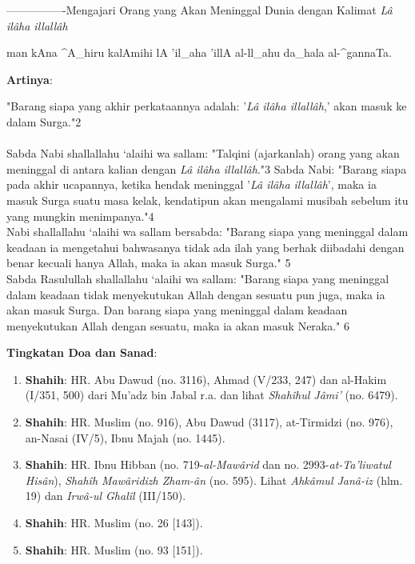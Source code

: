 \documentclass[a4paper,12pt]{article}
\begin{document}
\par
{}----------------Mengajari Orang yang Akan Meninggal Dunia dengan Kalimat 
\textit{L\^{a} il\^{a}ha illall\^{a}h}
\begin{arabtext}
\noindent
man kAna ^A_hiru kalAmihi lA 'il_aha 'illA al-ll_ahu da_hala al-^gannaTa.\\
\end{arabtext}
\noindent
\textbf{Artinya}:
\par
\indent "Barang siapa yang akhir perkataannya adalah: '\textit{L\^{a} 
il\^{a}ha illall\^{a}h},' akan masuk ke dalam Surga."{\scriptsize 2}\\\\
\indent Sabda Nabi shallallahu ‘alaihi wa sallam: "Talqini (ajarkanlah) 
orang yang akan meninggal di antara kalian dengan \textit{L\^{a} il\^{a}ha 
illall\^{a}h}."{\scriptsize 3}  Sabda Nabi: "Barang siapa pada akhir 
ucapannya, ketika hendak meninggal '\textit{L\^{a} il\^{a}ha 
illall\^{a}h}', maka ia masuk Surga suatu masa kelak, kendatipun akan 
mengalami musibah sebelum itu yang mungkin menimpanya."{\scriptsize 4}\\
\indent Nabi shallallahu ‘alaihi wa sallam bersabda: "Barang siapa yang 
meninggal dalam keadaan ia mengetahui bahwasanya tidak ada ilah yang berhak 
diibadahi dengan benar kecuali hanya Allah, maka ia akan masuk Surga."
{\scriptsize 5}\\
\indent Sabda Rasulullah shallallahu ‘alaihi wa sallam: "Barang siapa yang 
meninggal dalam keadaan tidak menyekutukan Allah dengan sesuatu pun juga, 
maka ia akan masuk Surga. Dan barang siapa yang meninggal dalam keadaan 
menyekutukan Allah dengan sesuatu, maka ia akan masuk Neraka."
{\scriptsize 6}\\
\par
\noindent
\textbf{Tingkatan Doa dan Sanad}:
\begin{enumerate}
\item \textbf{Shahih}: HR. Abu Dawud (no. 3116), Ahmad (V/233, 247) dan 
al-Hakim (I/351, 500) dari Mu'adz bin Jabal r.a. dan lihat 
\textit{Shah\^{i}hul J\^{a}mi'} (no. 6479).
\item \textbf{Shahih}: HR. Muslim (no. 916), Abu Dawud (3117), at-Tirmidzi 
(no. 976), an-Nasai (IV/5), Ibnu Majah (no. 1445).
\item \textbf{Shahih}: HR. Ibnu Hibban (no. 719-\textit{al-Maw\^{a}rid} dan
no. 2993-\textit{at-Ta'liwatul His\^{a}n}), \textit{Shah\^{i}h 
Maw\^{a}ridizh Zham-\^{a}n} (no. 595). Lihat \textit{Ahk\^{a}mul 
Jan\^{a}-iz} (hlm. 19) dan \textit{Irw\^{a}-ul Ghal\^{i}l} (III/150).
\item \textbf{Shahih}: HR. Muslim (no. 26 [143]).
\item \textbf{Shahih}: HR. Muslim (no. 93 [151]).\\\\
\end{enumerate}
\end{document}
